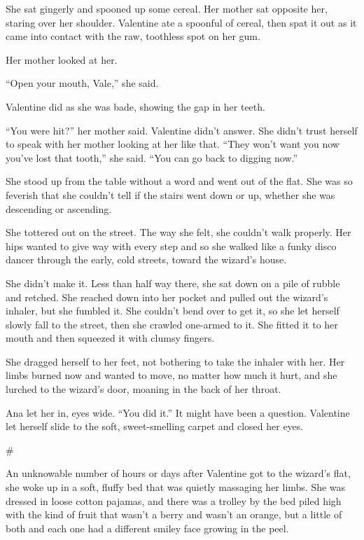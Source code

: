 She sat gingerly and spooned up some cereal. Her mother sat
opposite her, staring over her shoulder. Valentine ate a spoonful
of cereal, then spat it out as it came into contact with the raw,
toothless spot on her gum.

Her mother looked at her.

“Open your mouth, Vale,” she said.

Valentine did as she was bade, showing the gap in her teeth.

“You were hit?” her mother said. Valentine didn’t answer. She
didn’t trust herself to speak with her mother looking at her like
that. “They won’t want you now you’ve lost that tooth,” she said.
“You can go back to digging now.”

She stood up from the table without a word and went out of the
flat. She was so feverish that she couldn’t tell if the stairs went
down or up, whether she was descending or ascending.

She tottered out on the street. The way she felt, she couldn’t walk
properly. Her hips wanted to give way with every step and so she
walked like a funky disco dancer through the early, cold streets,
toward the wizard’s house.

She didn’t make it. Less than half way there, she sat down on a
pile of rubble and retched. She reached down into her pocket and
pulled out the wizard’s inhaler, but she fumbled it. She couldn’t
bend over to get it, so she let herself slowly fall to the street,
then she crawled one-armed to it. She fitted it to her mouth and
then squeezed it with clumsy fingers.

She dragged herself to her feet, not bothering to take the inhaler
with her. Her limbs burned now and wanted to move, no matter how
much it hurt, and she lurched to the wizard’s door, moaning in the
back of her throat.

Ana let her in, eyes wide. “You did it.” It might have been a
question. Valentine let herself slide to the soft, sweet-smelling
carpet and closed her eyes.

\#

An unknowable number of hours or days after Valentine got to the
wizard’s flat, she woke up in a soft, fluffy bed that was quietly
massaging her limbs. She was dressed in loose cotton pajamas, and
there was a trolley by the bed piled high with the kind of fruit
that wasn’t a berry and wasn’t an orange, but a little of both and
each one had a different smiley face growing in the peel.


